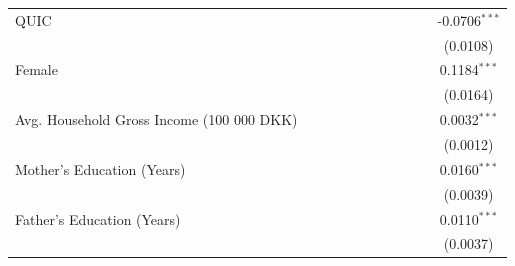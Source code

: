 \begin{tabular}{lcccccccccc}
   QUIC                                      &                 &                 &                 &                 &                 &                 &                       &                        &                 & -0.0706$^{***}$\\   
                                             &                 &                 &                 &                 &                 &                 &                       &                        &                 & (0.0108)\\   
   Female                                    &                 &                 &                 &                 &                 &                 &                       &                        &                 & 0.1184$^{***}$\\   
                                             &                 &                 &                 &                 &                 &                 &                       &                        &                 & (0.0164)\\   
   Avg. Household Gross Income (100 000 DKK) &                 &                 &                 &                 &                 &                 &                       &                        &                 & 0.0032$^{***}$\\   
                                             &                 &                 &                 &                 &                 &                 &                       &                        &                 & (0.0012)\\   
   Mother's Education (Years)                &                 &                 &                 &                 &                 &                 &                       &                        &                 & 0.0160$^{***}$\\   
                                             &                 &                 &                 &                 &                 &                 &                       &                        &                 & (0.0039)\\   
   Father's Education (Years)                &                 &                 &                 &                 &                 &                 &                       &                        &                 & 0.0110$^{***}$\\   
                                             &                 &                 &                 &                 &                 &                 &                       &                        &                 & (0.0037)\\   

\end{tabular}
